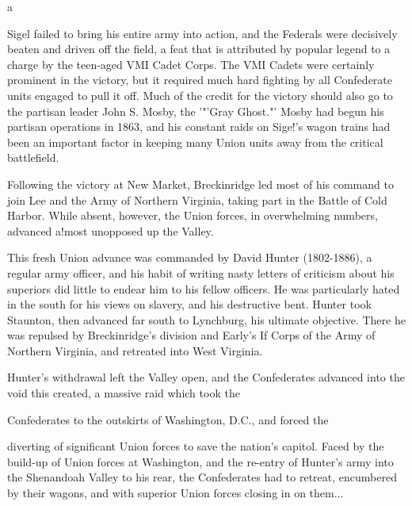 a

Sigel failed to bring his entire army into action, and the Federals were decisively beaten and driven off the field, a feat that is attributed by popular legend to a charge by the teen-aged VMI Cadet Corps. The VMI Cadets were certainly prominent in the victory, but it required much hard fighting by all Confederate units engaged to pull it off. Much of the credit for the victory should also go to the partisan leader John S. Mosby, the '"'Gray Ghost."' Mosby had begun his partisan operations in 1863, and his constant raids on Sige!'s wagon trains had been an important factor in keeping many Union units away from the critical battlefield.

Following the victory at New Market, Breckinridge led most of his command to join Lee and the Army of Northern Virginia, taking part in the Battle of Cold Harbor. While absent, however, the Union forces, in overwhelming numbers, advanced a!most unopposed up the Valley.

This fresh Union advance was commanded by David Hunter (1802-1886), a regular army officer, and his habit of writing nasty letters of criticism about his superiors did little to endear him to his fellow officers. He was particularly hated in the south for his views on slavery, and his destructive bent. Hunter took Staunton, then advanced far south to Lynchburg, his ultimate objective. There he was repulsed by Breckinridge's division and Early's If Corps of the Army of Northern Virginia, and retreated into West Virginia.

Hunter's withdrawal left the Valley open, and the Confederates advanced into the void this created, a massive raid which took the

\begin{scenariodata}
Confederates to the outskirts of Washington, D.C., and forced the\\
\end{scenariodata}

diverting of significant Union forces to save the nation's capitol. Faced by the build-up of Union forces at Washington, and the re-entry of Hunter's army into the Shenandoah Valley to his rear, the Confederates had to retreat, encumbered by their wagons, and with superior Union forces closing in on them...

